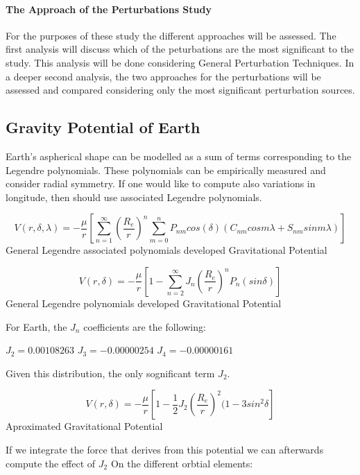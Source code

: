 \paragraph{The Approach of the Perturbations Study}
For the purposes of these study the different approaches will be assessed. The first analysis will discuss which of the peturbations are the most significant to the study. This analysis will be done considering General Perturbation Techniques. In a deeper second analysis, the two approaches for the perturbations will be assessed and compared considering only the most significant perturbation sources.

\subsection{Gravity Potential of Earth}
Earth's aspherical shape can be modelled as a sum of terms corresponding to the Legendre polynomials. These polynomials can be empirically measured and consider radial symmetry. If one would like to compute also variations in longitude, then should use associated Legendre polynomials.

\begin{equation}
V(r,\delta,\lambda) = -\frac{\mu}{r} \left [\sum_{n=1}^{\infty }\left  ( \frac{R_{e}}{r} \right ) ^{n} \sum_{m=0}^{n}P_{nm} cos(\delta )(C_{nm}cos m\lambda + S_{nm}sin m\lambda)  \right ]
\label{eq:Oblat}
\end{equation}
General Legendre associated polynomials developed Gravitational Potential

\begin{equation}
V(r,\delta) = -\frac{\mu}{r} \left [1-\sum_{n=2}^{\infty}   J_{n}\left( \frac{R_{e}}{r}\right) ^{n} P_{n} (sin\delta)  \right ]
\end{equation}
General Legendre polynomials developed Gravitational Potential

For Earth, the $J_{n}$ coefficients are the following:

$J_{2} = 0.00108263$
$J_{3} = -0.00000254$
$J_{4} = -0.00000161$

Given this distribution, the only sognificant term $J_{2}$.

\begin{equation}
V(r,\delta) = -\frac{\mu}{r} \left [1-\frac{1}{2}   J_{2}\left( \frac{R_{e}}{r}\right) ^{2} (1-3sin^2\delta  \right ]
\end{equation}
Aproximated Gravitational Potential

If we integrate the force that derives from this potential we can afterwards compute the effect of $J_{2}$ On the different orbtial elements:

